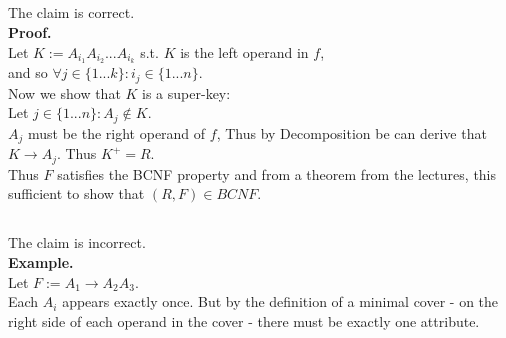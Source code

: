\subsection{}
The claim is correct.\\
\textbf{Proof.}\\
Let $K:=A_{i_1} A_{i_2} ... A_{i_k}$ s.t. $K$ is the left operand in $f$,\\
and so $\forall j\in\{1... k\}: i_j\in \{1...n\}$.\\

Now we show that $K$ is a super-key:\\
Let $j\in\{1...n\}: A_j\notin K$.\\
$A_j$ must be the right operand of $f$,
Thus by Decomposition be can derive that $K\rightarrow A_j$.
Thus $K^+=R$.\\
Thus $F$ satisfies the BCNF property and from a theorem from the lectures,
this sufficient to show that $(R,F)\in BCNF$.

\subsection{}
The claim is incorrect.\\
\textbf{Example.}\\
Let $F:=A_1\rightarrow A_2A_3$.\\
Each $A_i$ appears exactly once. But by the definition of a minimal cover - 
on the right side of each operand in the cover - there must be exactly one
attribute.